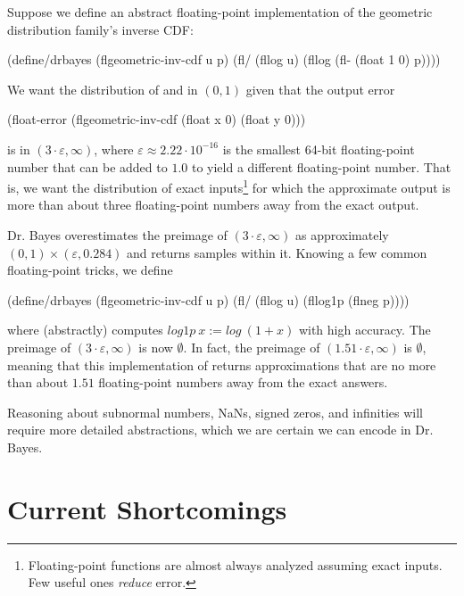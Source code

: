Suppose we define an abstract floating-point implementation of the geometric distribution family's inverse CDF:
\begin{center}\singlespacing
\begin{schemedisplay}
(define/drbayes (flgeometric-inv-cdf u p)
  (fl/ (fllog u) (fllog (fl- (float 1 0) p))))
\end{schemedisplay}
\end{center}
We want the distribution of  and  in $(0,1)$ given that the output error
\begin{center}
\begin{schemedisplay}
(float-error (flgeometric-inv-cdf (float x 0) (float y 0)))
\end{schemedisplay}
\end{center}
is in $(3 \cdot \varepsilon,\infty)$, where $\varepsilon \approx 2.22\cdot 10^{-16}$ is the smallest 64-bit floating-point number that can be added to $1.0$ to yield a different floating-point number.
That is, we want the distribution of exact inputs\footnote{Floating-point functions are almost always analyzed assuming exact inputs. Few useful ones \emph{reduce} error.} for which the approximate output is more than about three floating-point numbers away from the exact output.

Dr. Bayes overestimates the preimage of $(3 \cdot \varepsilon,\infty)$ as approximately $(0,1) \times (\varepsilon,0.284)$ and returns samples within it.
Knowing a few common floating-point tricks, we define
\begin{center}\singlespacing
\begin{schemedisplay}
(define/drbayes (flgeometric-inv-cdf u p)
  (fl/ (fllog u) (fllog1p (flneg p))))
\end{schemedisplay}
\end{center}
where  (abstractly) computes $log1p~x := log~(1+x)$ with high accuracy.
The preimage of $(3 \cdot \varepsilon,\infty)$ is now $\emptyset$.
In fact, the preimage of $(1.51 \cdot \varepsilon,\infty)$ is $\emptyset$, meaning that this implementation of  returns approximations that are no more than about $1.51$ floating-point numbers away from the exact answers.

Reasoning about subnormal numbers, NaNs, signed zeros, and infinities will require more detailed abstractions, which we are certain we can encode in Dr. Bayes.


\section{Current Shortcomings}

